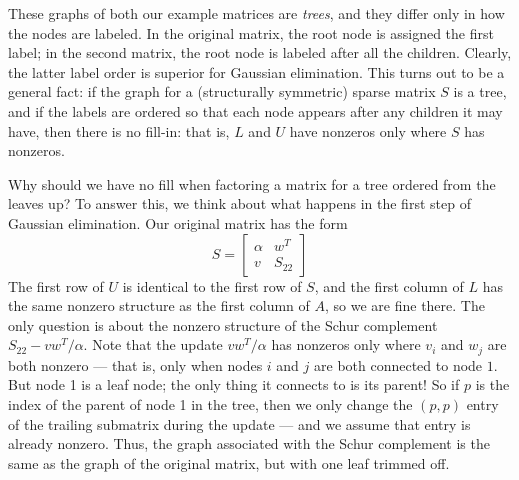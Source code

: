 These graphs of both our example matrices are {\em trees}, and they
differ only in how the nodes are labeled.  In the original matrix, the
root node is assigned the first label; in the second matrix, the root
node is labeled after all the children.  Clearly, the latter label
order is superior for Gaussian elimination.  This turns out to be a
general fact: if the graph for a (structurally symmetric) sparse
matrix $S$ is a tree, and if the labels are ordered so that each node
appears after any children it may have, then there is no fill-in: that
is, $L$ and $U$ have nonzeros only where $S$ has nonzeros.

Why should we have no fill when factoring a matrix for a tree ordered
from the leaves up?  To answer this, we think about what happens in the
first step of Gaussian elimination.  Our original matrix has the form
\[
  S = \begin{bmatrix} \alpha & w^T \\ v & S_{22} \end{bmatrix}
\]
The first row of $U$ is identical to the first row of $S$,
and the first column of $L$ has the same nonzero structure
as the first column of $A$, so we are fine there.
The only question is about the nonzero structure of the Schur
complement $S_{22}-vw^T/\alpha$.  Note that the update $vw^T/\alpha$
has nonzeros only where $v_i$ and $w_j$ are both nonzero --- that is,
only when nodes $i$ and $j$ are both connected to node $1$.  But node
1 is a leaf node; the only thing it connects to is its parent!  So if
$p$ is the index of the parent of node 1 in the tree, then we only
change the $(p,p)$ entry of the trailing submatrix during the update
--- and we assume that entry is already nonzero.  Thus, the graph
associated with the Schur complement is the same as the graph of the
original matrix, but with one leaf trimmed off.
